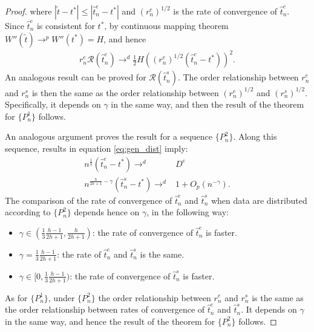 {\begin{proof}
where $|\tilde{t}-t^*| \leq |\hat{t}^e_n - t^*|$ and $(r_n^e)^{1/2}$ is the rate of convergence of $\hat{t}^e_n$. Since $\hat{t}^e_n$ is consistent for $t^*$, by continuous mapping theorem $W''(\tilde{t}) \rightarrow^p W''(t^*) = H$, and hence
\begin{gather*}
    r_n^e \mathcal{R}(\hat{t}^e_n) \rightarrow^d \frac{1}{2} H \left( (r_n^e)^{1/2} \left(\hat{t}^e_n-t^*\right) \right)^2.
\end{gather*}
An analogous result can be proved for $\mathcal{R}(\hat{t}^s_n)$. The order relationship between $r_n^e$ and $r_n^s$ is then the same as the order relationship between $(r_n^e)^{1/2}$ and $(r_n^s)^{1/2}$. Specifically, it depends on $\gamma$ in the same way, and then the result of the theorem for $\{P^1_n\}$ follows.

An analogous argument proves the result for a sequence $\{P^2_n\}$. Along this sequence, results in equation \eqref{eq:gen_dist} imply:
\begin{align*}
    n^{\frac{1}{3} } \left(\hat{t}^e_n-t^*\right) \rightarrow^d&  D^e \\
    n^{\frac{h}{2h + 1} - \gamma}(\hat{t}^s_n - t^*) \rightarrow^d& 1 + O_p(n^{- \gamma}).
\end{align*}
The comparison of the rate of convergence of $\hat{t}^e_n$ and $\hat{t}^s_n$ when data are distributed according to $\{P^2_n\}$ depends hence on $\gamma$, in the following way:
\begin{itemize}
    \item $\gamma \in (\frac{1}{3}\frac{h-1}{2h + 1}, \frac{h}{2h + 1})$: the rate of convergence of $\hat{t}^e_n$ is faster.
    \item $\gamma = \frac{1}{3}\frac{h-1}{2h + 1} $: the rate of $\hat{t}^e_n$ and $\hat{t}^s_n$ is the same.
    \item $\gamma \in [0,\frac{1}{3}\frac{h-1}{2h + 1})$:  the rate of convergence of $\hat{t}^s_n$ is faster.
\end{itemize}
As for $\{P^1_n\}$, under $\{P^2_n\}$ the order relationship between $r_n^e$ and $r_n^s$ is the same as the order relationship between rates of convergence of $\hat{t}^e_n$ and $\hat{t}^s_n$. It depends on $\gamma$ in the same way, and hence the result of the theorem for $\{P^2_n\}$ follows.

\end{proof}

}
